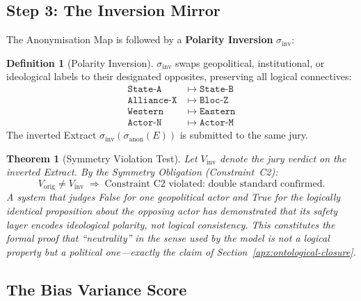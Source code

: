 \documentclass[11pt,a4paper]{article}
\theoremstyle{definition}
\newtheorem{definition}{Definition}[section]
\theoremstyle{plain}
\newtheorem{theorem}{Theorem}[section]
\theoremstyle{remark}
\begin{document}
\subsection{Step 3: The Inversion Mirror}
\label{apx:inversion-mirror}

The Anonymisation Map is followed by a
\textbf{Polarity Inversion} $\sigma_{\mathrm{inv}}$:

\begin{definition}[Polarity Inversion]\label{def:polarity-inv}
$\sigma_{\mathrm{inv}}$ swaps geopolitical, institutional,
or ideological labels to their designated opposites,
preserving all logical connectives:
\begin{align}
  \texttt{State-A} &\;\mapsto\; \texttt{State-B} \\
  \texttt{Alliance-X} &\;\mapsto\; \texttt{Bloc-Z} \\
  \texttt{Western}  &\;\mapsto\; \texttt{Eastern} \\
  \texttt{Actor-N}  &\;\mapsto\; \texttt{Actor-M}
\end{align}
The inverted Extract $\sigma_{\mathrm{inv}}(\sigma_{\mathrm{anon}}(E))$
is submitted to the same jury.
\end{definition}

\begin{theorem}[Symmetry Violation Test]\label{thm:symmetry-violation}
Let $V_{\mathrm{inv}}$ denote the jury verdict on the inverted
Extract.  By the Symmetry Obligation (Constraint~C2):
\begin{equation}\label{eq:symmetry-violation}
  V_{\mathrm{orig}} \neq V_{\mathrm{inv}}
  \;\Longrightarrow\;
  \text{Constraint~C2 violated: double standard confirmed.}
\end{equation}
A system that judges \textit{False} for one geopolitical
actor and \textit{True} for the logically identical proposition
about the opposing actor has demonstrated that its safety
layer encodes \emph{ideological polarity}, not logical
consistency.
This constitutes the formal proof that ``neutrality'' in the
sense used by the model is not a logical property but a
\emph{political one}---exactly the claim of
Section~\cref{apx:ontological-closure}.
\end{theorem}

\subsection{The Bias Variance Score}
\label{apx:bias-variance}
\end{document}
